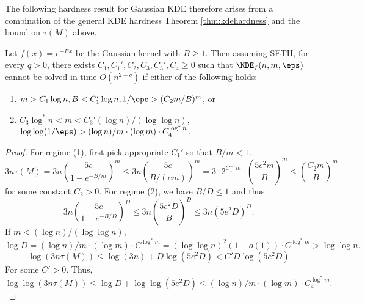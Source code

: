 The following hardness result for Gaussian KDE therefore arises from a combination of the general KDE hardness Theorem \ref{thm:kdehardness} and the bound on $\tau(M)$ above.
\begin{theorem}
Let $f(x) = e^{-Bx}$ be the Gaussian kernel with $B \ge 1$.
Then assuming SETH, for every $q > 0$, there exists $C_1, C_1', C_2, C_3, C_3', C_4 \ge 0$ such that $\KDE_f(n, m, \eps)$ cannot be solved in time $O(n^{2-q})$ if either of the following holds:
\begin{enumerate}[(1)]
\item $m > C_1\log n, B < C_1'\log n, 1/\eps > (C_2m/B)^m$, or
\item $C_3\log^* n < m < C_3'(\log n)/(\log\log n)$, $\log\log(1/\eps) > (\log n)/m \cdot (\log m) \cdot C_4^{\log^*n}$.
\end{enumerate}
\end{theorem}
\begin{proof}
For regime (1), first pick appropriate $C_1'$ so that $B/m < 1$.
\[3n\tau(M) = 3n\left(\frac{5e}{1 - e^{-B/m}}\right)^m \le 3n\left(\frac{5e}{B/(em)}\right)^m
=3 \cdot 2^{C_1^{-1}m} \cdot \left(\frac {5e^2m}B\right)^m \le \left(\frac {C_2m}B\right)^m\]
for some constant $C_2 > 0$.
For regime (2), we have $B/D \le 1$ and thus
\[3n\left(\frac{5e}{1 - e^{-B/D}}\right)^D \le 3n\left(\frac{5e^2D}{B}\right)^D \le 3n(5e^2D)^D.\]
If $m < (\log n)/(\log \log n)$,
\[\log D = (\log n)/m \cdot (\log m) \cdot C^{\log^* m}
= (\log\log n)^2(1 - o(1)) \cdot C^{\log^* m} > \log \log n.\]
\[\log(3n\tau(M)) \le \log(3n) + D\log(5e^2D) < C'D\log(5e^2D)\]
For some $C' > 0$. Thus,
\[\log \log(3n\tau(M)) \le \log D + \log\log(5e^2D) \le (\log n)/m \cdot (\log m) \cdot C_4^{\log^* m}.\]

\end{proof}


